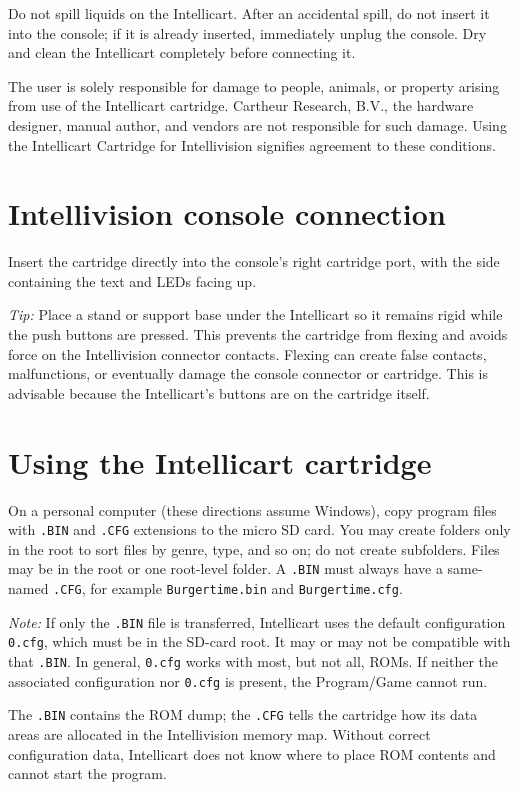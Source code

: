 \documentclass[a4paper,11pt]{article}
\newcommand{\file}[1]{\texttt{#1}}
\begin{document}
Do not spill liquids on the Intellicart. After an accidental spill, do not insert it into the console; if it is already inserted, immediately unplug the console. Dry and clean the Intellicart completely before connecting it.

The user is solely responsible for damage to people, animals, or property arising from use of the Intellicart cartridge. Cartheur Research, B.V., the hardware designer, manual author, and vendors are not responsible for such damage. Using the Intellicart Cartridge for Intellivision signifies agreement to these conditions.

\section*{Intellivision console connection}
Insert the cartridge directly into the console's right cartridge port, with the side containing the text and LEDs facing up.

\textit{Tip:} Place a stand or support base under the Intellicart so it remains rigid while the push buttons are pressed. This prevents the cartridge from flexing and avoids force on the Intellivision connector contacts. Flexing can create false contacts, malfunctions, or eventually damage the console connector or cartridge. This is advisable because the Intellicart's buttons are on the cartridge itself.

\section*{Using the Intellicart cartridge}
On a personal computer (these directions assume Windows), copy program files with \file{.BIN} and \file{.CFG} extensions to the micro SD card. You may create folders only in the root to sort files by genre, type, and so on; do not create subfolders. Files may be in the root or one root-level folder. A \file{.BIN} must always have a same-named \file{.CFG}, for example \file{Burgertime.bin} and \file{Burgertime.cfg}.

\textit{Note:} If only the \file{.BIN} file is transferred, Intellicart uses the default configuration \file{0.cfg}, which must be in the SD-card root. It may or may not be compatible with that \file{.BIN}. In general, \file{0.cfg} works with most, but not all, ROMs. If neither the associated configuration nor \file{0.cfg} is present, the Program/Game cannot run.

The \file{.BIN} contains the ROM dump; the \file{.CFG} tells the cartridge how its data areas are allocated in the Intellivision memory map. Without correct configuration data, Intellicart does not know where to place ROM contents and cannot start the program.
\end{document}
